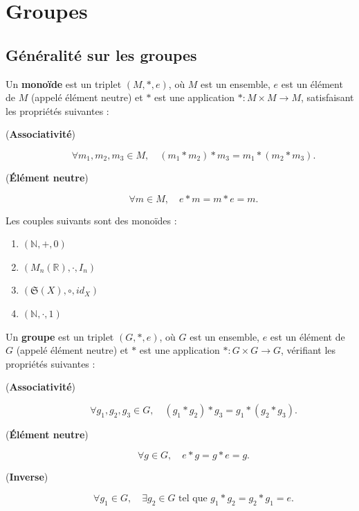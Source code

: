 \chapter{Groupes}

\section{Généralité sur les groupes}

\begin{definition}
    Un \textbf{monoïde} est un triplet $(M,*,e)$, où 
     $M$ est un ensemble, $e$ est un élément de  $M$ (appelé élément neutre) et $*$ est une application $* : M \times M \to M $,
    satisfaisant les propriétés suivantes :
    \begin{description}
        \item[(\textbf{Associativité})]  
        \[
        \forall m_1, m_2, m_3 \in M, \quad (m_1 * m_2) * m_3 = m_1 * (m_2 * m_3).
        \]
        
        \item[(\textbf{Élément neutre})]  
        \[
        \forall m \in M, \quad e * m = m * e = m.
        \]
    \end{description}
\end{definition}

\begin{exemple}
    Les couples suivants sont des monoïdes :
    \begin{enumerate}
        \item $(\mathbb{N},+, 0)$
        \item $(M_n(\mathbb{R}),\cdot, I_n)$
        \item $(\mathfrak{S}(X),\circ,id_X)$
        \item $(\mathbb{N},\cdot, 1)$
    \end{enumerate}
\end{exemple}

\begin{definition}
    Un \textbf{groupe} est un triplet $(G, *, e)$, où  $G$ est un ensemble, $e$ est un élément de  $G$ (appelé élément neutre) et $*$ est une application $* : G \times G \to G$, vérifiant les propriétés suivantes :
    \begin{description}
        \item[(\textbf{Associativité})]  
            \[
            \forall g_1, g_2, g_3 \in G, \quad (g_1 * g_2) * g_3 = g_1 * (g_2 * g_3).
            \]
        \item[(\textbf{Élément neutre})]
            \[
            \forall g \in G, \quad e * g = g * e = g.
            \]
        \item[(\textbf{Inverse})]  
            \[
            \forall g_1 \in G, \quad \exists g_2 \in G \text{ tel que } g_1 * g_2 = g_2 * g_1 = e.
            \]
    \end{description}
\end{definition}

